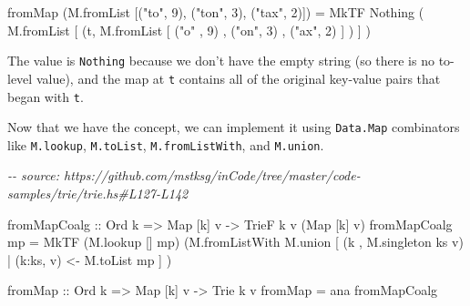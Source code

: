 \documentclass[]{article}
\newenvironment{Shaded}{}{}
\newcommand{\CharTok}[1]{\textcolor[rgb]{0.25,0.44,0.63}{#1}}
\newcommand{\CommentTok}[1]{\textcolor[rgb]{0.38,0.63,0.69}{\textit{#1}}}
\newcommand{\DataTypeTok}[1]{\textcolor[rgb]{0.56,0.13,0.00}{#1}}
\newcommand{\DecValTok}[1]{\textcolor[rgb]{0.25,0.63,0.44}{#1}}
\newcommand{\NormalTok}[1]{#1}
\newcommand{\OperatorTok}[1]{\textcolor[rgb]{0.40,0.40,0.40}{#1}}
\newcommand{\OtherTok}[1]{\textcolor[rgb]{0.00,0.44,0.13}{#1}}
\newcommand{\StringTok}[1]{\textcolor[rgb]{0.25,0.44,0.63}{#1}}
\begin{document}
\begin{Shaded}
\begin{Highlighting}[]
\NormalTok{fromMap (M.fromList [(}\StringTok{"to"}\NormalTok{, }\DecValTok{9}\NormalTok{), (}\StringTok{"ton"}\NormalTok{, }\DecValTok{3}\NormalTok{), (}\StringTok{"tax"}\NormalTok{, }\DecValTok{2}\NormalTok{)])}
    \OtherTok{=} \DataTypeTok{MkTF} \DataTypeTok{Nothing}\NormalTok{ (}
\NormalTok{          M.fromList [}
\NormalTok{            (}\CharTok{\textquotesingle{}t\textquotesingle{}}\NormalTok{, M.fromList [}
\NormalTok{                (}\StringTok{"o"}\NormalTok{ , }\DecValTok{9}\NormalTok{)}
\NormalTok{              , (}\StringTok{"on"}\NormalTok{, }\DecValTok{3}\NormalTok{)}
\NormalTok{              , (}\StringTok{"ax"}\NormalTok{, }\DecValTok{2}\NormalTok{)}
\NormalTok{              ]}
\NormalTok{            )}
\NormalTok{          ]}
\NormalTok{        )}
\end{Highlighting}
\end{Shaded}

The value is \texttt{Nothing} because we don't have the empty string (so there
is no to-level value), and the map at \texttt{t} contains all of the original
key-value pairs that began with \texttt{t}.

Now that we have the concept, we can implement it using \texttt{Data.Map}
combinators like \texttt{M.lookup}, \texttt{M.toList}, \texttt{M.fromListWith},
and \texttt{M.union}.

\begin{Shaded}
\begin{Highlighting}[]
\CommentTok{{-}{-} source: https://github.com/mstksg/inCode/tree/master/code{-}samples/trie/trie.hs\#L127{-}L142}

\NormalTok{fromMapCoalg}
\OtherTok{    ::} \DataTypeTok{Ord}\NormalTok{ k}
    \OtherTok{=\textgreater{}} \DataTypeTok{Map}\NormalTok{ [k] v}
    \OtherTok{{-}\textgreater{}} \DataTypeTok{TrieF}\NormalTok{ k v (}\DataTypeTok{Map}\NormalTok{ [k] v)}
\NormalTok{fromMapCoalg mp }\OtherTok{=} \DataTypeTok{MkTF}\NormalTok{ (M.lookup [] mp)}
\NormalTok{                       (M.fromListWith M.union}
\NormalTok{                          [ (k   , M.singleton ks v)}
                          \OperatorTok{|}\NormalTok{ (k}\OperatorTok{:}\NormalTok{ks, v) }\OtherTok{\textless{}{-}}\NormalTok{ M.toList mp}
\NormalTok{                          ]}
\NormalTok{                       )}

\NormalTok{fromMap}
\OtherTok{    ::} \DataTypeTok{Ord}\NormalTok{ k}
    \OtherTok{=\textgreater{}} \DataTypeTok{Map}\NormalTok{ [k] v}
    \OtherTok{{-}\textgreater{}} \DataTypeTok{Trie}\NormalTok{ k v}
\NormalTok{fromMap }\OtherTok{=}\NormalTok{ ana fromMapCoalg}
\end{Highlighting}
\end{Shaded}
\end{document}
